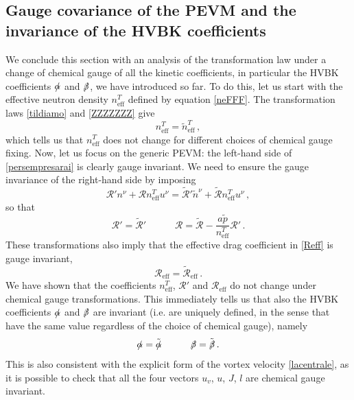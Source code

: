 \documentclass[preprints,article,accept,moreauthors,pdftex]{mdpi}
\newcommand{\spc}{\quad \quad \quad}
\begin{document}
\subsection{Gauge covariance of the PEVM and the invariance of the HVBK coefficients}

We conclude this section with an analysis of the transformation law under a change of chemical gauge of all the kinetic coefficients, in particular the HVBK coefficients $\slashed{\alpha}$ and $\slashed{\beta}$, we have introduced so far. 
To do this, let us start with the effective neutron density $n^T_{\text{eff}}$ defined by equation \eqref{neFFF}. The transformation laws \eqref{tildiamo} and \eqref{ZZZZZZZ} give
\begin{equation}
 n^T_{\text{eff}} = \tilde{n}^T_{\text{eff}}  \, ,
\end{equation}
which tells us that $n^T_{\text{eff}}$ does not change for different choices of chemical gauge fixing.
Now, let us focus on the generic PEVM: the left-hand side of \eqref{persempresarai} is clearly gauge invariant. We need to ensure the gauge invariance of the right-hand side by imposing
\begin{equation}
\mathcal{R}' n^\nu + \mathcal{R} n^T_{\text{eff}} u^\nu = \tilde{\mathcal{R}}' \tilde{n}^\nu + \tilde{\mathcal{R}} n^T_{\text{eff}} u^\nu \, , 
\end{equation}
so that
\begin{equation}
\mathcal{R}' =\tilde{\mathcal{R}}'   \spc  \mathcal{R} =  \tilde{\mathcal{R}}- \dfrac{a \tilde{p}}{ n^T_{\text{eff}}} \mathcal{R}' \, .
\end{equation}
These transformations also imply  that the effective drag coefficient in \eqref{Reff} is gauge invariant,
\begin{equation}
\mathcal{R}_{\text{eff}}  = \tilde{\mathcal{R}}_{\text{eff}} \, .
\end{equation}
We have shown that the coefficients $n^T_{\text{eff}}$, $ \mathcal{R}'$ and $\mathcal{R}_{\text{eff}}$ do not change under chemical gauge transformations. This immediately tells us that also the HVBK coefficients $\slashed{\alpha}$ and $\slashed{\beta}$ are invariant (i.e. are uniquely defined, in the sense that have the same value regardless of the choice of chemical gauge), namely
\begin{equation}
\slashed{\alpha} =\tilde{\slashed{\alpha}} \spc \slashed{\beta} =\tilde{\slashed{\beta}} \, .
\end{equation}
This is also consistent with the explicit form of the vortex velocity \eqref{lacentrale}, as it is possible to check that all the four vectors $u_v$, $u$, $J$, $l$ are  chemical gauge invariant.
\end{document}
